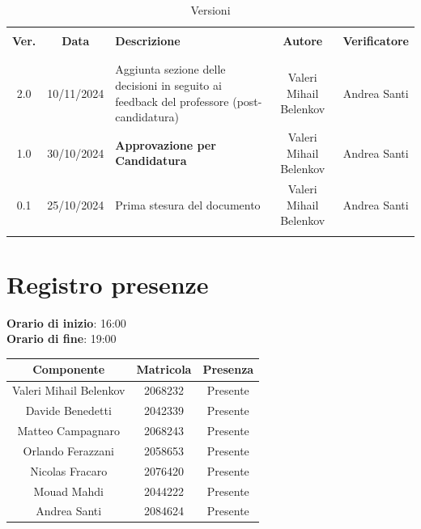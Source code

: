 \documentclass[italian, 12pt]{article}
\begin{document}
\pagestyle{mystyle}


\begin{table}[!h]
	\caption{Versioni}
	\begin{center}
        \fontsize{11.9}{13}\selectfont
		\begin{tabular}{ c c p{6.2cm} c c}
			\hline \\[-2ex]
			\textbf{Ver.} & \textbf{Data} & \textbf{Descrizione} & \textbf{Autore} & \textbf{Verificatore}  \\
			\\[-2ex] \hline \\[-1.5ex]
            2.0 & 10/11/2024 & Aggiunta sezione delle decisioni in seguito ai feedback del professore (post-candidatura) & Valeri Mihail Belenkov & Andrea Santi\\
            1.0 & 30/10/2024 & \textbf{Approvazione per Candidatura} & Valeri Mihail Belenkov & Andrea Santi\\
			0.1 & 25/10/2024 & Prima stesura del documento & Valeri Mihail Belenkov & Andrea Santi\\
			\\[-1.5ex] \hline
		\end{tabular}
	\end{center}
\end{table}


\tableofcontents
\newpage


\section{Registro presenze}

\textbf{Orario di inizio}: 16:00\\
\textbf{Orario di fine}: 19:00\\


\begin{flushleft}
	\begin{table}[!h]
	\begin{tabular}{ |c|c|c| } 
		\hline
		\textbf{Componente} & \textbf{Matricola} & \textbf{Presenza} \\
  \hline 
		Valeri Mihail Belenkov & 2068232 & Presente \\
		Davide Benedetti 	& 2042339 & Presente \\
		Matteo Campagnaro	& 2068243 & Presente \\
		Orlando Ferazzani 	& 2058653 & Presente \\
		Nicolas Fracaro 	& 2076420 & Presente \\
		Mouad Mahdi		    & 2044222 & Presente \\ 
		Andrea Santi 	    & 2084624 & Presente \\
		\hline
	\end{tabular}
	\end{table}
	\end{flushleft}
\end{document}
